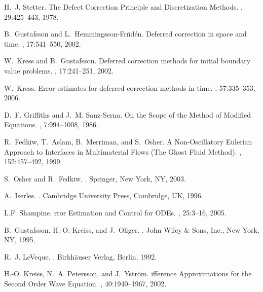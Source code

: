 \documentclass[fleqn,12pt,twoside]{article}
\begin{document}
\begin{thebibliography}{10}
H.~J. Stetter.
\newblock The {D}efect {C}orrection {P}rinciple and {D}iscretization {M}ethods.
, 29:425--443, 1978.

B.~Gustafsson and L.~Hemmingsson-Fr\"nd\'en.
\newblock Deferred correction in space and time.
, 17:541--550, 2002.

W.~Kress and B.~Gustafsson.
\newblock Deferred correction methods for initial boundary value problems.
, 17:241--251, 2002.

W.~Kress.
\newblock Error estimates for deferred correction methods in time.
, 57:335--353, 2006.

D.~F. Griffiths and J.~M. Sanz-Serna.
\newblock On the {S}cope of the {M}ethod of {M}odified {E}quations.
, 7:994--1008, 1986.

R.~Fedkiw, T.~Aslam, B.~Merriman, and S.~Osher.
\newblock A {N}on-{O}scillatory {E}ulerian {A}pproach to {I}nterfaces in
  {M}ultimaterial {F}lows ({T}he {G}host {F}luid {M}ethod).
, 152:457--492, 1999.

S.~Osher and R.~Fedkiw.
.
\newblock Springer, New York, NY, 2003.

A.~Iserles.
.
\newblock Cambridge University Press, Cambridge, UK, 1996.

L.F. Shampine.
rror {E}stimation and {C}ontrol for {ODE}s.
, 25:3--16, 2005.

B.~Gustafsson, H.-O. Kreiss, and J.~Oliger.
.
\newblock John Wiley \& Sons, Inc., New York, NY, 1995.

R.~J. LeVeque.
.
\newblock Birkh\"auser Verlag, Berlin, 1992.

H.-O. Kreiss, N.~A. Petersson, and J.~Ystr\"om.
ifference {A}pproximations for the {S}econd {O}rder {W}ave
  {E}quation.
, 40:1940--1967, 2002.


\end{thebibliography}
\end{document}
